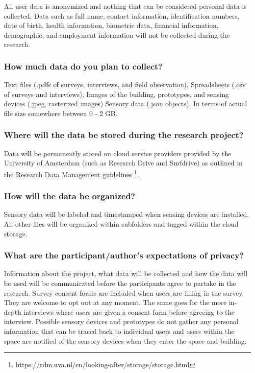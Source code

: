 \documentclass[a4paper]{article}
\begin{document}
All user data is anonymized and nothing that can be considered personal data is collected. Data such as full name, contact information, identification numbers, date of birth, health information, biometric data, financial information, demographic, and employment information will not be collected during the research.

\subsubsection{How much data do you plan to collect?}

Text files (.pdfs of surveys, interviews, and field observation), Spreadsheets (.csv of surveys and interviews), Images of the building, prototypes, and sensing devices (.jpeg, rasterized images) Sensory data (.json objects). In terms of actual file size somewhere between 0 - 2 GB.

\subsubsection{Where will the data be stored during the research project?}

Data will be permanently stored on cloud service providers provided by the University of Amsterdam (such as Research Drive and Surfdrive) as outlined in the Research Data Management guidelines \footnote{https://rdm.uva.nl/en/looking-after/storage/storage.html}. 

\subsubsection{How will the data be organized?}
Sensory data will be labeled and timestamped when sensing devices are installed. All other files will be organized within subfolders and tagged within the cloud storage.

\subsubsection{What are the participant/author’s expectations of privacy?}
Information about the project, what data will be collected and how the data will be used will be communicated before the participants agree to partake in the research. Survey consent forms are included when users are filling in the survey. They are welcome to opt out at any moment. The same goes for the more in-depth interviews where users are given a consent form before agreeing to the interview. Possible sensory devices and prototypes do not gather any personal information that can be traced back to individual users and users within the space are notified of the sensory devices when they enter the space and building.
\end{document}
